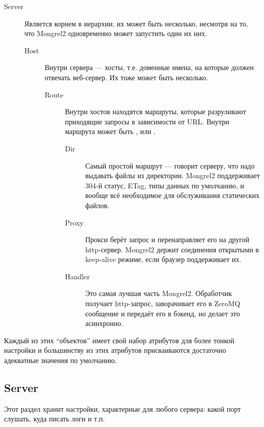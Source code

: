 \begin{description}
  \item[Server] Является корнем в иерархии; их может быть несколько, несмотря на то, что 
    Mongrel2 одновременно может запустить один их них.
  \begin{description}
    \item[Host] Внутри сервера --- хосты, т.е. доменные имена, на
      которые должен отвечать веб-сервер. Их тоже может быть несколько.
    \begin{description}
      \item[Route] Внутри хостов находятся маршруты, которые
        разруливают приходящие запросы в зависимости от URL. Внутри
        маршрута может быть ,  или .
      \begin{description}
        \item[Dir] Самый простой маршрут --- говорит серверу, что надо
          выдавать файлы из директории. Mongrel2 поддерживает 304-й статус,
          ETag, типы данных по умолчанию, и вообще всё необходимое для
          обслуживания статических файлов.
        \item[Proxy] Прокси берёт запрос и перенаправляет его на
          другой http-сервер. Mongrel2 держит соединения открытыми в keep-alive
          режиме, если браузер поддерживает их.
        \item[Handler] Это самая лучшая часть Mongrel2. Обработчик
          получает http-запрос, заворачивает его в ZeroMQ сообщение и передаёт
          его в бэкенд, но делает это асинхронно.
      \end{description}
    \end{description}
  \end{description}
\end{description}

Каждый из этих ``объектов'' имеет свой набор атрибутов для более
тонкой настройки и большинству из этих атрибутов присваиваются
достаточно адекватные значения по умолчанию.

\subsection{Server}

Этот раздел хранит настройки, характерные для любого сервера: какой
порт слушать, куда писать логи и т.п.

